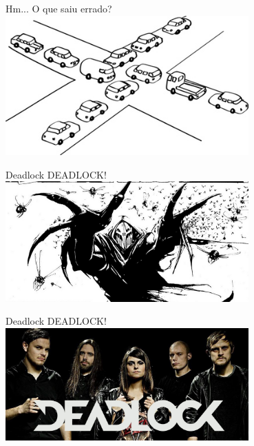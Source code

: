 \documentclass{beamer}
\begin{document}
\begin{frame}[fragile]{Hm...}
  \centering
  \LARGE
  O que saiu errado?
  \includegraphics[width=0.7\textwidth]{deadlock1.jpeg}
\end{frame}


\begin{frame}[fragile]{Deadlock}
  \centering
  \LARGE
  DEADLOCK!\\
  \includegraphics[width=0.7\textwidth]{evil_deadlock.jpg}
\end{frame}

\begin{frame}[fragile]{Deadlock}
  \centering
  \LARGE
  DEADLOCK!\\
  \includegraphics[width=0.7\textwidth]{dead-lock-cover.jpg}
\end{frame}
\end{document}
